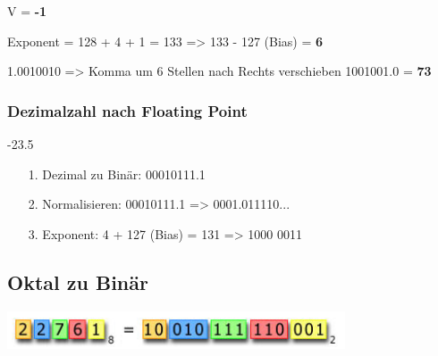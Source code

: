 V = \textbf{-1}

Exponent = 128 + 4 + 1 = 133 => 133 - 127 (Bias) = \textbf{6}

1.0010010 => Komma um 6 Stellen nach Rechts verschieben
1001001.0 = \textbf{73}

\subsubsection*{Dezimalzahl nach Floating Point}

-23.5
\begin{itemize}
\item[1.] Dezimal zu Binär: 00010111.1
\item[2.] Normalisieren: 00010111.1 => 0001.011110...
\item[3.] Exponent: 4 + 127 (Bias) = 131 => 1000 0011
\end{itemize}
\subsection*{Oktal zu Binär}
\begin{center}
	\includegraphics[width=10cm]{images/oktbin}
\end{center}